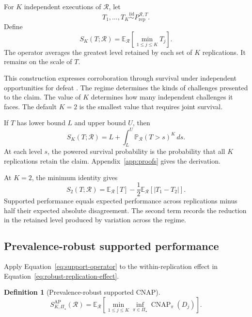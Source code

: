 \documentclass[11pt]{article}
\newcommand{\CNAP}{\operatorname{CNAP}}
\newcommand{\Regime}{\mathcal{R}}
\newcommand{\PSet}{\Pi_\star}
\newcommand{\E}{\mathbb{E}}
\newcommand{\Prb}{\mathbb{P}}
\newcommand{\iid}{\mathrel{\overset{\mathrm{iid}}{\sim}}}
\newcommand{\SRob}{S_{K,\PSet}^{\mathrm{AP}}(\Regime)}
\newtheorem{definition}{Definition}
\theoremstyle{remark}
\begin{document}
For $K$ independent executions of $\Regime$, let
\[
T_1,\ldots,T_K
\iid
P_{\mathrm{rep}}^{\Regime,T}.
\]
Define
\begin{equation}
S_K(T;\Regime)
=
\E_{\Regime}
\left[
\min_{1\leq j\leq K}T_j
\right].
\label{eq:support-operator}
\end{equation}
The operator averages the greatest level retained by each set of $K$ replications. It remains on the scale of $T$.

This construction expresses corroboration through survival under independent opportunities for defeat \cite{popper1959logic,mayo1996error}. The regime determines the kinds of challenges presented to the claim. The value of $K$ determines how many independent challenges it faces. The default $K=2$ is the smallest value that requires joint survival.

If $T$ has lower bound $L$ and upper bound $U$, then
\begin{equation}
S_K(T;\Regime)
=
L+\int_L^U
\Prb_{\Regime}(T>s)^K\,ds.
\label{eq:support-survival}
\end{equation}
At each level $s$, the powered survival probability is the probability that all $K$ replications retain the claim. Appendix~\ref{app:proofs} gives the derivation.

At $K=2$, the minimum identity gives
\begin{equation}
S_2(T;\Regime)
=
\E_{\Regime}[T]
-
\frac12
\E_{\Regime}
\left[
|T_1-T_2|
\right].
\label{eq:k2-decomposition}
\end{equation}
Supported performance equals expected performance across replications minus half their expected absolute disagreement. The second term records the reduction in the retained level produced by variation across the regime.

\subsection{Prevalence-robust supported performance}

Apply Equation~\eqref{eq:support-operator} to the within-replication effect in Equation~\eqref{eq:robust-replication-effect}.

\begin{definition}[Prevalence-robust supported CNAP]
\begin{equation}
\SRob
=
\E_{\Regime}
\left[
\min_{1\leq j\leq K}
\inf_{\pi\in\PSet}
\CNAP_\pi(D_j)
\right].
\label{eq:robust-support}
\end{equation}
\end{definition}
\end{document}
